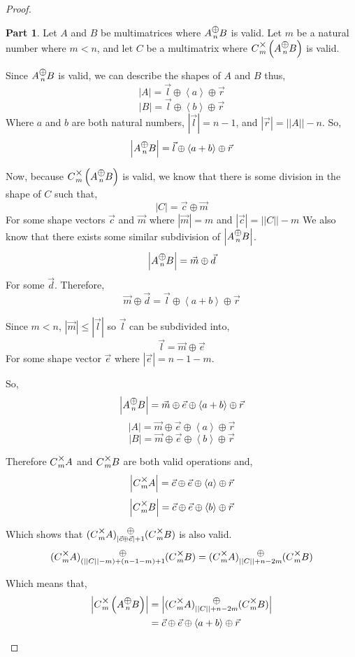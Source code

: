 \documentclass[12pt]{book}
\theoremstyle{plain}
\theoremstyle{definition}
\theoremstyle{ppart}
\newtheorem{ppart}{Part}
\theoremstyle{case}
\theoremstyle{solution}
\newcommand{\mmult}[1]{\text{\raisebox{1ex}{$\underset{#1}{\times}$}}}
\newcommand{\mconcat}[1]{\text{\raisebox{1ex}{$\underset{#1}{\oplus}$}}}
\newcommand{\shape}[1]{\left|#1\right|}
\begin{document}
\begin{proof}
\begin{ppart}
Let $A$ and $B$ be multimatrices where $A \mconcat{n} B$ is valid. 
Let $m$ be a natural number where $m < n$, and let $C$ be a multimatrix where
$C \mmult{m} \left(A \mconcat{n} B\right)$ is valid.

Since $A \mconcat{n} B$ is valid, we can describe the shapes of $A$ and $B$ thus,
\[ \shape{A} = \vec{l} \oplus \left<a\right> \oplus \vec{r} \]
\[ \shape{B} = \vec{l} \oplus \left<b\right> \oplus \vec{r} \]
Where $a$ and $b$ are both natural numbers, $\shape{\vec{l}} = n-1$, and
$\shape{\vec{r}} = \shape{\shape{A}} - n$. So,
\[ \shape{A \mconcat{n} B} = \vec{l} \oplus \left<a+b\right> \oplus \vec{r} \]

Now, because $C \mmult{m} \left(A \mconcat{n} B\right)$ is valid, we know that
there is some division in the shape of $C$ such that,
\[ \shape{C} = \vec{c} \oplus \vec{m} \]
For some shape vectors $\vec{c}$ and $\vec{m}$ where $\shape{\vec{m}} = m$ and
$\shape{\vec{c}} = \shape{\shape{C}}-m$
We also know that there exists some similar subdivision of $\shape{A \mconcat{n} B}$.
\[ \shape{A \mconcat{n} B} = \vec{m} \oplus \vec{d} \]
For some $\vec{d}$. Therefore,
\[ \vec{m} \oplus \vec{d} = \vec{l} \oplus \left<a + b\right> \oplus \vec{r} \]

Since $m < n$, $\shape{\vec{m}} \le \shape{\vec{l}}$ so $\vec{l}$ can be subdivided
into,
\[ \vec{l} = \vec{m} \oplus \vec{e} \]
For some shape vector $\vec{e}$ where $\shape{\vec{e}} = n-1-m$.

So,
\[ \shape{A \mconcat{n} B} = \vec{m} \oplus \vec{e} \oplus \left<a+b\right> \oplus \vec{r} \]
\[ \shape{A} = \vec{m} \oplus \vec{e} \oplus \left<a\right> \oplus \vec{r} \]
\[ \shape{B} = \vec{m} \oplus \vec{e} \oplus \left<b\right> \oplus \vec{r} \]

Therefore $C \mmult{m} A$ and $C \mmult{m} B$ are both valid operations and,
\[ \shape{C \mmult{m} A} = \vec{c} \oplus \vec{e} \oplus \left<a\right> \oplus \vec{r} \]
\[ \shape{C \mmult{m} B} = \vec{c} \oplus \vec{e} \oplus \left<b\right> \oplus \vec{r} \]

Which shows that $(C \mmult{m} A) \mconcat{\shape{\vec{c} \oplus \vec{e}}+1} (C \mmult{m} B)$
is also valid.
\[
  (C \mmult{m} A) \mconcat{(\shape{\shape{C}}-m)+(n-1-m)+1} (C \mmult{m} B)
  = 
  (C \mmult{m} A) \mconcat{\shape{\shape{C}}+n-2m} (C \mmult{m} B)
\]

\begin{landscape}
Which means that,
\begin{align*}
  \shape{C \mmult{m} \left(A \mconcat{n} B\right)}
  &= \shape{(C \mmult{m} A) \mconcat{\shape{\shape{C}}+n-2m} (C \mmult{m} B)} \\
  &= \vec{c} \oplus \vec{e} \oplus \left<a+b\right> \oplus \vec{r}
\end{align*}


\end{landscape}
\end{ppart}
\end{proof}
\end{document}
